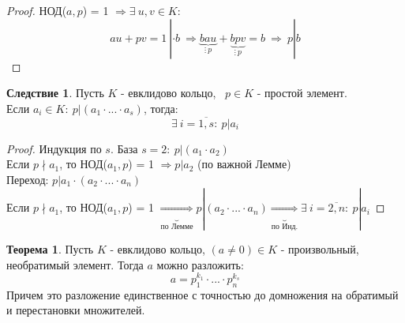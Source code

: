 \documentclass[a4paper, 12pt]{article}
\theoremstyle{definition}
\newtheorem*{theorem}{Теорема}
\newtheorem*{consequense}{Следствие}
\begin{document}
  \begin{proof}
    НОД($a,p$) = 1 $\Longrightarrow \exists \ u, v \in K:$ 
    $$ au+pv = 1 \ | \cdot b \ \Longrightarrow \underbrace{bau}_{\vdots \ p} +\underbrace{bpv}_{\vdots \ p}  = b  \ \Longrightarrow \ p|b$$ 
  \end{proof}
  \begin{consequense}
    Пусть $K$ - евклидово кольцо, \ $p \in K$ - простой элемент.\\
    Если $a_i \in K: \ p|(a_1\cdot ... \cdot a_s)$, тогда:
    $$\exists \ i = \overline{1, s}: \ p|a_i$$  
  \end{consequense}
  \begin{proof}
    Индукция по $s$. База $s=2: \ p|(a_1 \cdot a_2)$ \\
    Если $p\nmid a_1$, то НОД($a_1,p$) = 1 $\Longrightarrow p | a_2$ (по важной Лемме)\\
    Переход: $p|a_1 \cdot (a_2\cdot ... \cdot a_n)$\\
    Если $p \nmid a_1$, то НОД($a_1,p$) = 1 $\underbrace{\Longrightarrow}_{\text{по Лемме}} p|(a_2\cdot ... \cdot a_n) \underbrace{\Longrightarrow}_{\text{по Инд.}}  \exists \ i = \overline{2, n}: \ p|a_i$  
  \end{proof} 
  \begin{theorem}
    Пусть $K$ - евклидово кольцо, $(a\neq 0) \in K$ - произвольный, необратимый элемент. Тогда $a$ можно разложить:
    $$a = p_1^{k_1}\cdot ...\cdot p_n^{k_s}$$
    Причем это разложение единственное с точностью до домножения на обратимый и перестановки множителей.   
  \end{theorem}
\end{document}
